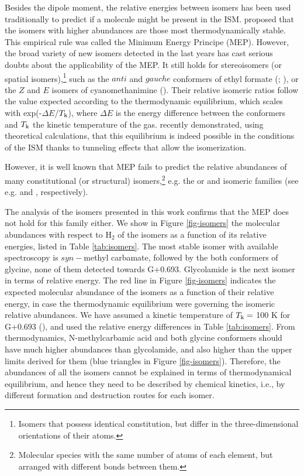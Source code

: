 \documentclass[twocolumn]{aastex63}
\begin{document}
Besides the dipole moment, the relative energies between isomers has been used  traditionally to predict if a molecule might be present in the ISM.
\citet{lattelais2011} proposed that the isomers with higher abundances are those most thermodynamically stable. This empirical rule was called the Minimum Energy Principe (MEP).
However, the broad variety of new isomers detected in the last years has cast serious doubts about the applicability of the MEP. 
It still holds for stereoisomers (or spatial isomers),\footnote{Isomers that possess identical constitution, but differ in the three-dimensional 
orientations of their atoms.} such as the $anti$ and $gauche$ conformers of ethyl formate (; \citealt{tercero_discovery_2013,rivilla_chemical_2017}), or the $Z$ and $E$ isomers of cyanomethanimine ().
Their relative isomeric ratios follow the value expected according to the thermodynamic equilibrium, which scales with exp(-$\Delta E$/$T_{\rm k}$), where $\Delta E$ is the energy difference between the conformers and $T_{\rm k}$ the kinetic temperature of the gas. \citet{garciadelaconcepcion2021} recently demonstrated, using theoretical calculations, that this equilibrium is indeed possible in the conditions of the ISM thanks to tunneling effects that allow the isomerization.
  
However, it is well known that MEP fails to predict the relative abundances of many constitutional (or structural) isomers,\footnote{Molecular species with the same number of atoms of each element, but arranged with different bonds between them.} e.g. the  or  and isomeric families (see e.g. \citealt{shingledecker2019} and \citealt{mininni2020}, respectively).

The analysis of the  isomers presented in this work confirms that the MEP does not hold for this family either. 
We show in Figure \ref{fig-isomers} the molecular abundances with respect to H$_{2}$ of the 
 isomers as a function of its relative energies, listed in  Table \ref{tab:isomers}.
The most stable isomer with available spectroscopy is $syn-$methyl carbamate, followed by the both conformers of glycine, none of them detected towards G+0.693.  
Glycolamide is the next isomer in terms of relative energy. The red line in Figure \ref{fig-isomers} indicates the expected molecular abundance of the  isomers as a function of their relative energy, in case the thermodynamic equilibrium were governing the isomeric relative abundances. We have assumed a kinetic temperature of $T_{\rm k} =$ 100 K for G+0.693 (\citealt{zeng2018}), and used the relative energy differences in Table \ref{tab:isomers}. From thermodynamics, N-methylcarbamic acid and both glycine conformers should have much higher abundances than glycolamide, and also higher than the upper limits derived for them (blue triangles in Figure \ref{fig-isomers}). Therefore, the abundances of all the  isomers cannot be explained in terms of thermodynamical equilibrium, and hence they need to be described by chemical kinetics, i.e., by different formation and destruction routes for each isomer. 
\end{document}

